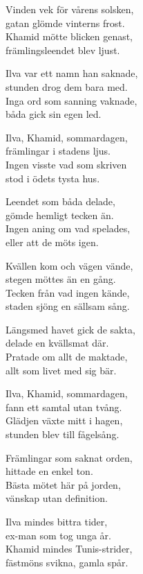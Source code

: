 \begin{lyrics}
Vinden vek för vårens solsken,\\
gatan glömde vinterns frost.\\
Khamid mötte blicken genast,\\
främlingsleendet blev ljust.

Ilva var ett namn han saknade,\\
stunden drog dem bara med.\\
Inga ord som sanning vaknade,\\
båda gick sin egen led.

Ilva, Khamid, sommardagen,\\
främlingar i stadens ljus.\\
Ingen visste vad som skriven\\
stod i ödets tysta hus.

Leendet som båda delade,\\
gömde hemligt tecken än.\\
Ingen aning om vad spelades,\\
eller att de möts igen.

Kvällen kom och vägen vände,\\
stegen möttes än en gång.\\
Tecken från vad ingen kände,\\
staden sjöng en sällsam sång.

Längsmed havet gick de sakta,\\
delade en kvällsmat där.\\
Pratade om allt de maktade,\\
allt som livet med sig bär.

Ilva, Khamid, sommardagen,\\
fann ett samtal utan tvång.\\
Glädjen växte mitt i hagen,\\
stunden blev till fågelsång.

Främlingar som saknat orden,\\
hittade en enkel ton.\\
Bästa mötet här på jorden,\\
vänskap utan definition.

Ilva mindes bittra tider,\\
ex-man som tog unga år.\\
Khamid mindes Tunis-strider,\\
fästmöns svikna, gamla spår.


\end{lyrics}
